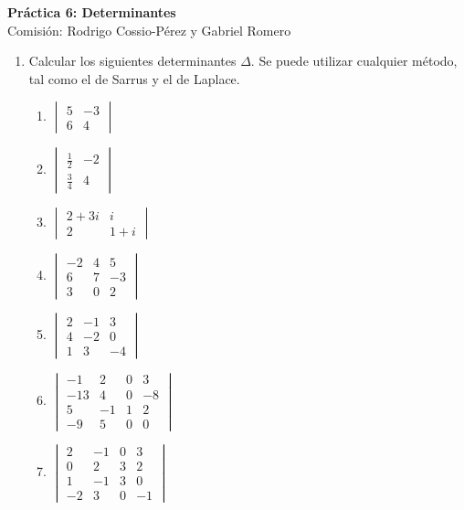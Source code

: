 \documentclass[a4paper]{article}
\newcommand{\exercise}{\item}
\begin{document}
\noindent \hrulefill 
\vspace{-7pt}
\begin{center} 
	\textbf{ Práctica 6: Determinantes } \\
	Comisión: Rodrigo Cossio-Pérez y Gabriel Romero
\end{center}
\vspace{-10pt}
\hrulefill
\begin{enumerate}
	\exercise Calcular los siguientes determinantes $\Delta$. Se puede utilizar cualquier método, tal como el de Sarrus y el de Laplace.
	\begin{multicols}{3}
	\begin{enumerate} [label=(\alph*)]
		\item $\begin{vmatrix} 5 & -3 \\ 6 & 4\end{vmatrix}$
		\item $\begin{vmatrix} \frac{1}{2} & -2 \\ \frac{3}{4} & 4\end{vmatrix}$
		\item $\begin{vmatrix} 2+3i & i \\ 2 & 1+i\end{vmatrix}$
		\item $\begin{vmatrix} -2 & 4 & 5 \\ 6 & 7 & -3 \\ 3 & 0 & 2 \end{vmatrix}$
		\item $\begin{vmatrix} 2 & -1 & 3 \\ 4 & -2 & 0 \\ 1 & 3 & -4 \end{vmatrix}$
		\item $\begin{vmatrix} -1 & 2 & 0 & 3 \\ -13 & 4 & 0 & -8 \\ 5 & -1 & 1 & 2 \\ -9 & 5 & 0 & 0 \end{vmatrix}$
		\item $\begin{vmatrix} 2 & -1 & 0 & 3 \\ 0 & 2 & 3 & 2 \\ 1 & -1 & 3 & 0 \\ -2 & 3 & 0 & -1 \end{vmatrix}$

\end{enumerate}
\end{multicols}
\end{enumerate}
\end{document}
